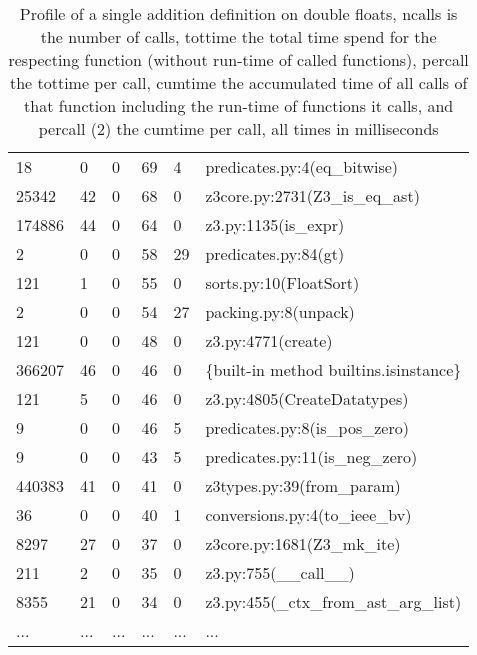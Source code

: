 \documentclass[a4paper,UKenglish,cleveref, autoref, thm-restate]{lipics-v2019}
\begin{document}
\begin{table}[]
\begin{tabular}{lllll|l}
		18      & 0       & 0       & 69      & 4       & predicates.py:4(eq\_bitwise)                                   \\
		25342   & 42      & 0       & 68      & 0       & z3core.py:2731(Z3\_is\_eq\_ast)                                \\
		174886  & 44      & 0       & 64      & 0       & z3.py:1135(is\_expr)                                           \\
		2       & 0       & 0       & 58      & 29      & predicates.py:84(gt)                                           \\
		121     & 1       & 0       & 55      & 0       & sorts.py:10(FloatSort)                                         \\
		2       & 0       & 0       & 54      & 27      & packing.py:8(unpack)                                           \\
		121     & 0       & 0       & 48      & 0       & z3.py:4771(create)                                             \\
		366207  & 46      & 0       & 46      & 0       & \{built-in method builtins.isinstance\}                        \\
		121     & 5       & 0       & 46      & 0       & z3.py:4805(CreateDatatypes)                                    \\
		9       & 0       & 0       & 46      & 5       & predicates.py:8(is\_pos\_zero)                                 \\
		9       & 0       & 0       & 43      & 5       & predicates.py:11(is\_neg\_zero)                                \\
		440383  & 41      & 0       & 41      & 0       & z3types.py:39(from\_param)                                     \\
		36      & 0       & 0       & 40      & 1       & conversions.py:4(to\_ieee\_bv)                                 \\
		8297    & 27      & 0       & 37      & 0       & z3core.py:1681(Z3\_mk\_ite)                                    \\
		211     & 2       & 0       & 35      & 0       & z3.py:755(\_\_call\_\_)                                        \\
		8355    & 21      & 0       & 34      & 0       & z3.py:455(\_ctx\_from\_ast\_arg\_list)                         \\
		...	    &...     & ... & ... &... & ...   
	\end{tabular}
	\caption{Profile of a single addition definition on double floats, ncalls is the number of calls, tottime the total time spend for the respecting function (without run-time of called functions), percall the tottime per call, cumtime the accumulated time of all calls of that function including the run-time of functions it calls, and percall (2) the cumtime per call, all times in milliseconds}
	\label{tab:singleadditiondefinition}
\end{table}
\end{document}
